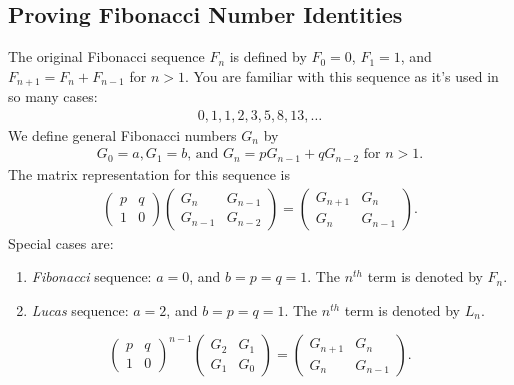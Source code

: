 \documentclass{subfile}
\begin{document}
\subsection{Proving Fibonacci Number Identities}
The original Fibonacci sequence $F_n$ is defined by $F_0=0$, $F_1=1$, and $F_{n+1} = F_{n}+F_{n-1}$ for $n>1$. You are familiar with this sequence as it's used in so many cases:
\begin{align*}
0,1,1,2,3,5,8,13,\ldots
\end{align*}
We define general Fibonacci numbers $G_n$ by
\begin{align*}
G_0=a,G_1=b\text{, and } G_n=pG_{n-1}+qG_{n-2} \text{ for } n>1.
\end{align*}
The matrix representation for this sequence is
\begin{align*}
\begin{pmatrix}
p & q\\
1 & 0
\end{pmatrix}
\begin{pmatrix}
G_n & G_{n-1}\\
G_{n-1} & G_{n-2}
\end{pmatrix}=
\begin{pmatrix}
G_{n+1} & G_n\\
G_n & G_{n-1}
\end{pmatrix}.
\end{align*}
Special cases are:
\begin{enumerate}
\item \textit{Fibonacci} sequence: $a=0$, and $b=p=q=1$. The $n^{th}$ term is denoted by $F_n$.
\item \textit{Lucas} sequence: $a=2$, and $b=p=q=1$. The $n^{th}$ term is denoted by $L_n$.
\end{enumerate}

\begin{theorem}
\begin{equation}
\begin{pmatrix}
p & q\\
1 & 0
\end{pmatrix}^{n-1}
\begin{pmatrix}
G_2 & G_1\\
G_1 & G_0
\end{pmatrix}=
\begin{pmatrix}
G_{n+1} & G_n\\
G_n & G_{n-1}
\end{pmatrix}.\label{eqn:generalfibo}
\end{equation}
\end{theorem}
\end{document}

